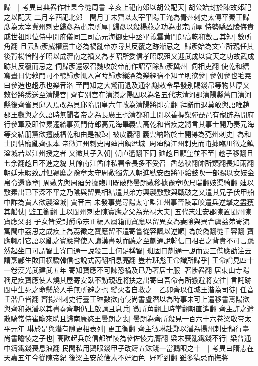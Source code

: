 歸　|{
	考異曰典畧作杜杲今從周書}
辛亥上祀南郊以胡公配天|{
	胡公始封於陳故郊祀之以配天}
二月辛酉祀北郊　閏月丁未齊以太宰平陽王淹為青州刺史太傅平秦王歸彥為太宰冀州刺史歸彥為肅宗所厚|{
	歸彥以殺楊燕之功為肅宗所厚}
恃勢驕盈陵侮貴戚世祖即位侍中開府儀同三司高元海御史中丞畢義雲黄門郎高乾和數言其短|{
	數所角翻}
且云歸彥威權震主必為禍亂帝亦㝷其反覆之跡漸忌之|{
	歸彥始為文宣所親任其後背楊愔附孝昭以成濟南之禍又為孝昭所委信孝昭既殂又迎武成以貪天之功故武成跡其反覆而忌之}
伺歸彥還家召魏收於帝前作詔草除歸彥冀州|{
	伺相吏翻}
使乾和繕寫晝日仍敕門司不聽歸彥輒入宫時歸彥縱酒為樂經宿不知至明欲參|{
	參朝參也毛晃曰參造也趨承也樂音洛}
至門知之大驚而退及通名謝敕令早發别賜錢帛等物甚厚又敕督將悉送至清陽宫|{
	齊有别宫在清淇之陽因以為名五代志清河郡清陽縣舊曰清河縣後齊省貝邱入焉改為貝邱隋開皇六年改為清陽將即亮翻}
拜辭而退莫敢與語唯趙郡王叡與之久語時無聞者帝之為長廣王也清都和士開以善握槊彈琵琶有寵辟為開府行參軍及即位累遷給事黄門侍郎高元海畢義雲高乾和皆疾之將言其事士開乃奏元海等交結朋黨欲擅威福乾和由是被疎|{
	被皮義翻}
義雲納賂於士開得為兗州刺史|{
	為和士開怙寵亂齊張本}
帝徵江州刺史周廸出鎮湓城|{
	周廸領江州刺史而屯據臨川徵之鎮湓城若以江州授之者}
又徵其子入朝|{
	朝直遙翻下同}
廸趑且顧望並不至|{
	趑子移翻且七余翻趑且不進之貌}
其餘南江酋帥私署令長多不受召|{
	酋慈秋翻帥所類翻長知兩翻}
朝廷未暇致討但羈縻之豫章太守周敷獨先入朝進號安西將軍給鼓吹一部賜以女妓金帛令還豫章|{
	周敷先與周廸分據臨川既破熊曇朗敷移據豫章吹尺瑞翻妓渠綺翻}
廸以敷素出已下深不平之乃隂與留異相結遣其弟方興襲敷敷與戰破之又遣其兄子伏甲船中詐為賈人欲襲湓城|{
	賈音古}
未發事覺尋陽太守監江州事晉陵華皎遣兵逆擊之盡獲其船仗|{
	監工銜翻}
上以閩州刺史陳寶應之父為光禄大夫|{
	五代志建安郡陳置閩州陳寶應父羽}
子女皆受封爵命宗正編入屬籍而寶應以留異女為妻隂與異合虞荔弟寄流寓閩中荔思之成疾上為荔徵之寶應留不遣寄嘗從容諷以逆順|{
	為於偽翻從千容翻}
寶應輒引它語以亂之寶應嘗使人讀漢書臥而聽之至蒯通說韓信曰相君之背貴不可言蹶然起坐曰可謂智士寄曰通一說殺三士何足稱智|{
	班固曰蒯通一說而喪三儁應劭注云謂烹酈生敗田横驕韓信也說式芮翻相息亮翻}
豈若班彪王命識所歸乎|{
	王命論見四十一卷漢光武建武五年}
寄知寶應不可諫恐禍及已乃著居士服|{
	著陟畧翻}
居東山寺陽稱足疾寶應使人燒其屋寄安臥不動親近將扶之出寄曰吾命有所懸避將安往|{
	言託跡閩中生死之命懸於人手無所避之也}
縱火者自救之　乙卯齊以任城王湝為司徒|{
	任音壬湝戶皆翻}
齊揚州刺史行臺王琳數欲南侵尚書盧潛以為時事未可上遣移書夀陽欲與齊和親潛以其書奏齊朝仍上啟請且息兵|{
	數所角翻上時掌翻朝直遙翻}
齊主許之遣散騎常侍崔瞻來聘且歸南康愍王曇朗之喪|{
	曇朗為齊所殺見一百六十六卷梁敬帝太平元年}
琳於是與潛有隙更相表列|{
	更工衡翻}
齊主徵琳赴鄴以潛為揚州刺史領行臺尚書瞻㥄之子也|{
	高歡起兵於信都崔㥄為參佐㥄力膺翻}
梁末喪亂鐵錢不行|{
	梁普通中鑄鐵錢喪息浪翻}
民間私用鵝眼錢甲子改鑄五銖錢一當鵝眼之十　|{
	考異曰隋志在天嘉五年今從陳帝紀}
後梁主安於儉素不好酒色|{
	好呼到翻}
雖多猜忌而撫將

